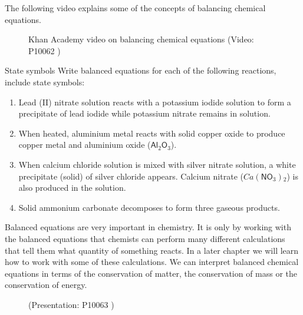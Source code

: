 \label{m38727*eip-44}The following video explains some of the concepts of balancing chemical equations.\newline
    \setcounter{subfigure}{0}
	\begin{figure}[H] %
    \textnormal{Khan Academy video on balancing chemical equations}\vspace{.1in} \nopagebreak
  \label{m38727*yt-media1}\label{m38727*yt-video1}
             { (Video:  P10062 )}
      \vspace{2pt}
    \vspace{.1in}
 \end{figure}       \par \label{m38727*secfhsst!!!underscore!!!id1261}
 \begin{activity}{State symbols}
            \nopagebreak
      \label{m38727*id66790}Write balanced equations for each of the following reactions, include state symbols:\par 
      \label{m38727*id66796}\begin{enumerate}[noitemsep, label=\textbf{\arabic*}. ] 
        \label{m38727*uid33}\item Lead (II) nitrate solution reacts with a potassium iodide solution to form a precipitate of lead iodide while potassium nitrate remains in solution.
\label{m38727*uid34}\item When heated, aluminium metal reacts with solid copper oxide to produce copper metal and aluminium oxide (${\mathsf{Al}}_{2}{\mathsf{O}}_{3}$).
\label{m38727*uid35}\item When calcium chloride solution is mixed with silver nitrate solution, a white precipitate (solid) of silver chloride appears. Calcium nitrate ($Ca\left({\mathsf{NO}}_{3}\right){}_{2}$) is also produced in the solution.
\item Solid ammonium carbonate decomposes to form three gaseous products.
        \end{enumerate}
\end{activity}
    \label{m38727*eip-429}Balanced equations are very important in chemistry. It is only by working with the balanced equations that chemists can perform many different calculations that tell them what quantity of something reacts. In a later chapter we will learn how to work with some of these calculations. We can interpret balanced chemical equations in terms of the conservation of matter, the conservation of mass or the conservation of energy. \label{m38727*eip-366}
    \setcounter{subfigure}{0}
	\begin{figure}[H] %
    \label{m38727*slidesharemedia}\label{m38727*slideshareflash} { (Presentation:  P10063 )} \end{figure}
